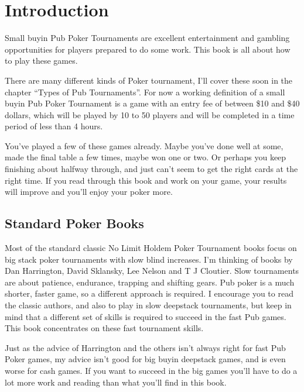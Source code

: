 \chapter{Introduction}


Small buyin Pub Poker Tournaments are excellent entertainment and
gambling opportunities for players prepared to do some work. This
book is all about how to play these games.

There are many different kinds of Poker tournament, I'll cover these
soon in the chapter ``Types of Pub Tournaments''. For now a
working definition of a small buyin
Pub Poker Tournament is a game with an entry fee of between \$10
and \$40 dollars, which will be played by 10 to 50 players
and will be completed in a time period of less than 4 hours.

You've played a few of these games already. Maybe you've done well at some,
made the final table a few times, maybe won one or two.
Or perhaps you keep finishing about halfway through, and just can't seem to
get the right cards at the right time. If you read through this book and
work on your game, your results will improve and you'll enjoy your poker more.

\section*{Standard Poker Books}


Most of the standard classic No Limit Holdem Poker Tournament books
focus on big stack poker tournaments with slow blind increases.
I'm thinking of books by Dan Harrington, David Sklansky, Lee Nelson
and T J Cloutier. Slow tournaments are about patience, endurance,
trapping and shifting gears. Pub poker is a much
shorter, faster game, so a different approach
is required. I encourage you to read the
classic authors, and also to play in slow deepstack tournaments,
but keep in mind that a different set of skills is required to succeed
in the fast Pub games. This book concentrates on these fast
tournament skills.

Just as the advice of Harrington and the others isn't always right
for fast Pub Poker games, my advice isn't good
for big buyin deepstack games, and is even worse for
cash games. If you want to succeed in the big games you'll have to do a
lot more work and reading than what you'll find in this book.

